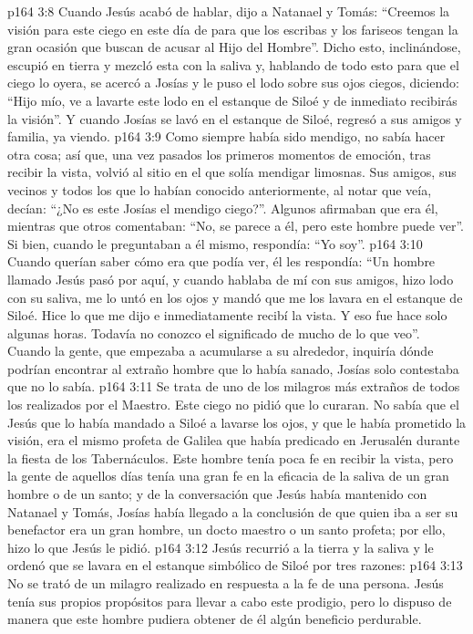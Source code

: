 \vs p164 3:8 Cuando Jesús acabó de hablar, dijo a Natanael y Tomás: “Creemos la visión para este ciego en este día de  para que los escribas y los fariseos tengan la gran ocasión que buscan de acusar al Hijo del Hombre”. Dicho esto, inclinándose, escupió en tierra y mezcló esta con la saliva y, hablando de todo esto para que el ciego lo oyera, se acercó a Josías y le puso el lodo sobre sus ojos ciegos, diciendo: “Hijo mío, ve a lavarte este lodo en el estanque de Siloé y de inmediato recibirás la visión”. Y cuando Josías se lavó en el estanque de Siloé, regresó a sus amigos y familia, ya viendo.
\vs p164 3:9 Como siempre había sido mendigo, no sabía hacer otra cosa; así que, una vez pasados los primeros momentos de emoción, tras recibir la vista, volvió al sitio en el que solía mendigar limosnas. Sus amigos, sus vecinos y todos los que lo habían conocido anteriormente, al notar que veía, decían: “¿No es este Josías el mendigo ciego?”. Algunos afirmaban que era él, mientras que otros comentaban: “No, se parece a él, pero este hombre puede ver”. Si bien, cuando le preguntaban a él mismo, respondía: “Yo soy”.
\vs p164 3:10 Cuando querían saber cómo era que podía ver, él les respondía: “Un hombre llamado Jesús pasó por aquí, y cuando hablaba de mí con sus amigos, hizo lodo con su saliva, me lo untó en los ojos y mandó que me los lavara en el estanque de Siloé. Hice lo que me dijo e inmediatamente recibí la vista. Y eso fue hace solo algunas horas. Todavía no conozco el significado de mucho de lo que veo”. Cuando la gente, que empezaba a acumularse a su alrededor, inquiría dónde podrían encontrar al extraño hombre que lo había sanado, Josías solo contestaba que no lo sabía.
\vs p164 3:11 \pc Se trata de uno de los milagros más extraños de todos los realizados por el Maestro. Este ciego no pidió que lo curaran. No sabía que el Jesús que lo había mandado a Siloé a lavarse los ojos, y que le había prometido la visión, era el mismo profeta de Galilea que había predicado en Jerusalén durante la fiesta de los Tabernáculos. Este hombre tenía poca fe en recibir la vista, pero la gente de aquellos días tenía una gran fe en la eficacia de la saliva de un gran hombre o de un santo; y de la conversación que Jesús había mantenido con Natanael y Tomás, Josías había llegado a la conclusión de que quien iba a ser su benefactor era un gran hombre, un docto maestro o un santo profeta; por ello, hizo lo que Jesús le pidió.
\vs p164 3:12 Jesús recurrió a la tierra y la saliva y le ordenó que se lavara en el estanque simbólico de Siloé por tres razones:
\vs p164 3:13 No se trató de un milagro realizado en respuesta a la fe de una persona. Jesús tenía sus propios propósitos para llevar a cabo este prodigio, pero lo dispuso de manera que este hombre pudiera obtener de él algún beneficio perdurable.
